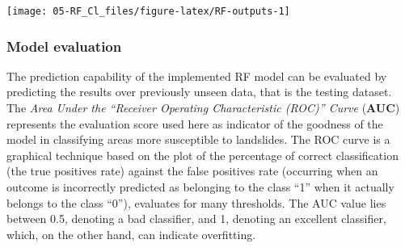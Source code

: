 \documentclass[
]{article}
\begin{document}
\begin{center}\texttt{[image: 05-RF\_Cl\_files/figure-latex/RF-outputs-1]} \end{center}

\subsubsection{Model evaluation}\label{model-evaluation}

The prediction capability of the implemented RF model can be evaluated by predicting the results over previously unseen data, that is the testing dataset.
The \emph{Area Under the ``Receiver Operating Characteristic (ROC)'' Curve} (\textbf{AUC}) represents the evaluation score used here as indicator of the goodness of the model in classifying areas more susceptible to landslides.
The ROC curve is a graphical technique based on the plot of the percentage of correct classification (the true positives rate) against the false positives rate (occurring when an outcome is incorrectly predicted as belonging to the class ``1'' when it actually belongs to the class ``0''), evaluates for many thresholds.
The AUC value lies between 0.5, denoting a bad classifier, and 1, denoting an excellent classifier, which, on the other hand, can indicate overfitting.
\end{document}
